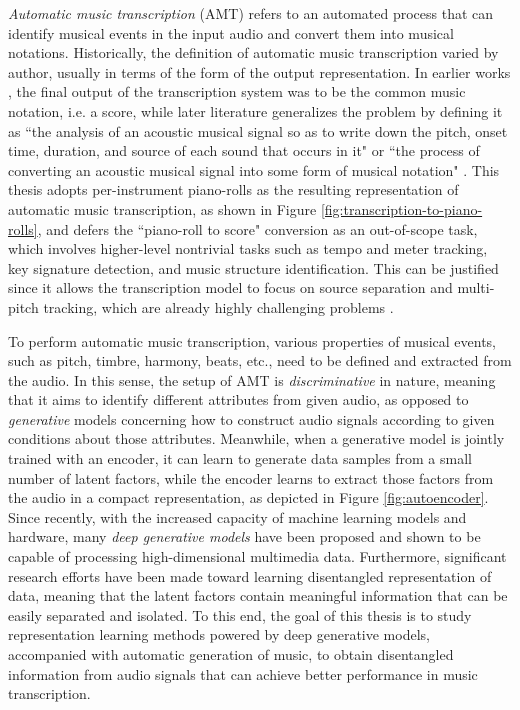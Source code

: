 \emph{Automatic music transcription} (AMT) refers to an automated process that can identify musical events in the input audio and convert them into musical notations.
Historically, the definition of automatic music transcription varied by author, usually in terms of the form of the output representation.
In earlier works \cite{moorer1977transcription,piszczalski1977transcription}, the final output of the transcription system was to be the common music notation, i.e. a score, while later literature generalizes the problem by defining it as ``the analysis of an acoustic musical signal so as to write down the pitch, onset time, duration, and source of each sound that occurs in it" \cite{klapuri2006transcription} or ``the process of converting an acoustic musical signal into some form of musical notation" \cite{benetos2013amt}.
This thesis adopts per-instrument piano-rolls as the resulting representation of automatic music transcription, as shown in Figure \ref{fig:transcription-to-piano-rolls}, and defers the ``piano-roll to score" conversion as an out-of-scope task, which involves higher-level nontrivial tasks such as tempo and meter tracking, key signature detection, and music structure identification.
This can be justified since it allows the transcription model to focus on source separation and multi-pitch tracking, which are already highly challenging problems \cite{cemgil2006generative}.


To perform automatic music transcription, various properties of musical events, such as pitch, timbre, harmony, beats, etc., need to be defined and extracted from the audio.
In this sense, the setup of AMT is \emph{discriminative} in nature, meaning that it aims to identify different attributes from given audio, as opposed to \emph{generative} models concerning how to construct audio signals according to given conditions about those attributes.
Meanwhile, when a generative model is jointly trained with an encoder, it can learn to generate data samples from a small number of latent factors, while the encoder learns to extract those factors from the audio in a compact representation, as depicted in Figure \ref{fig:autoencoder}.
Since recently, with the increased capacity of machine learning models and hardware, many \emph{deep generative models} have been proposed and shown to be capable of processing high-dimensional multimedia data.
Furthermore, significant research efforts have been made toward learning disentangled representation of data, meaning that the latent factors contain meaningful information that can be easily separated and isolated.
To this end, the goal of this thesis is to study representation learning methods powered by deep generative models, accompanied with automatic generation of music, to obtain disentangled information from audio signals that can achieve better performance in music transcription.


